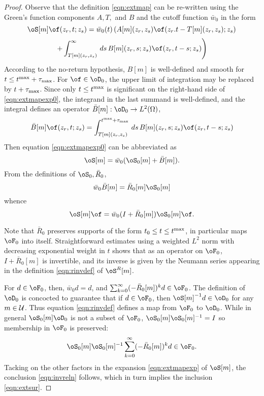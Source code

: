 \begin{proof} 
Observe that  the definition \ref{eqn:extmap} can be re-written using
the Green's function components $A, T,$ and $B$ and the cutoff function
$\bar{w}_0$ in the form
\[
\oS[m]\of(z_r,t;z_s) = \bar{w}_0(t) \left(
A[m](z_r,z_s)\of(z_r.t-T[m](z_r,z_s);z_s) \right.
\]
\begin{equation}
\label{eqn:extmapexp0}
\left.+ \int_{T[m](z_r,z_s)}^{\infty}\,ds\,B[m](z_r,s;z_s)\of(z_r,t-s;z_s)\right)
\end{equation}
According to the no-return hypothesis, $B[m]$ is well-defined and
smooth for $t \le t^{\rm max} + \tau_{\rm max}$. For $\of \in
\oD_0$, the upper limit of integration may be replaced by $t + \tau_{\rm max}$. Since only
$t\le t^{\rm max}$ is significant on the right-hand side of
\ref{eqn:extmapexp0}, the integrand in the last summand is
well-defined, and the integral defines an
operator $\bar{B}[m]: \oD_0  \rightarrow L^2(\Omega)$,
\begin{equation}
\label{eqn:barb}
\bar{B}[m]\of(z_r,t;z_s) = 
\int_{T[m](z_r,z_s)}^{t^{\rm max}+\tau_{\rm max}}\,ds\,B[m](z_r,s;z_s)\of(z_r,t-s;z_s)
\end{equation}
Then equation \ref{eqn:extmapexp0} can be abbreviated as
\begin{equation}
\label{eqn:extmapexpabbrev}
\oS[m] = \bar{w}_0 (\oS_0[m] + \bar{B}[m]).
\end{equation}
From the definitions of $\oS_0,\bar{R}_0$,
\[
\bar{w}_0\bar{B}[m] = \bar{R}_0[m]\oS_0[m]
\]
whence
\begin{equation}
\label{eqn:extmapexp}
\oS[m]\of = \bar{w}_0(I + \bar{R}_0[m]) \oS_0[m]\of.
\end{equation}


Note that $\bar{R}_0$ preserves supports of the form $t_0 \le t \le
t^{\rm max}$, in particular maps $\oF_0$ into itself.
Straightforward estimates using a weighted $L^2$ norm with decreasing
exponential weight in $t$ shows that as an operator on $\oF_0$, $I + \bar{R}_0[m]$ is invertible,
and its inverse is given by the Neumann series appearing in the
definition \ref{eqn:rinvdef} of $\oS^R[m]$.

For $d \in \oF_0$, then, $\bar{w}_0 d = d $, and
$\sum_{k=0}^{\infty}(-\bar{R}_0[m])^kd  \in \oF_0$. The definition of
$\oD_0$ is concocted to guarantee that if $d \in \oF_0$, then
$\oS[m]^{-1}d \in \oD_0$ for any $m \in {\cal U}$. Thus equation
\ref{eqn:rinvdef} defines a map from $\oF_0$ to $\oD_0$. While in
general $\oS_0[m]\oD_0$ is not a subset of $\oF_0$,
$\oS_0[m]\oS_0[m]^{-1} = I $ so membership in $\oF_0$ is preserved:
\[
\oS_0[m]\oS_0[m]^{-1}\sum_{k=0}^{\infty}(-\bar{R}_0[m])^kd  \in \oF_0.
\]
Tacking on the other factors in the expansion \ref{eqn:extmapexp} of
$\oS[m]$,  the conclusion \ref{eqn:invreln} follows, which in turn
implies the inclusion \ref{eqn:extsur}.
\end{proof}


